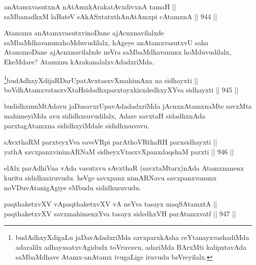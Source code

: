 \begin{shl}
anAtamxvasutxnA nA\s \s tAmx\s kArakatAvxdivxnA tamaH || \\
saMbanadhxM laBateV sAkASxtatxthA\s nAtAmx\s pi cA\s \s tamxnA \hfill || 944 ||  
\end{shl}

\begin{artha}
Atamxnu anAtamxvasutxvinoDane ajAcnxnavilalxde saMbaMdhavanunx\break hoMduvudilalx, hAgeye anAtamxvasutxvU saha AtamxnoDane ajAcnxnavilalxde neVra saMbaMdhavanunx hoMduvudilalx, EkeMdare? Atamxnu kArakanalalxvAdadxriMda.
\end{artha}



\begin{shl}
\footnote{budAdhxyXdigaLu jaDavAdadxriMda savxparxkAsha ceYtanayxvashadiMda adaralilx adhayxsatxvAgidudx toVruvavu, adariMda BArxMti kalipxtavAda saMbaMdhave Atamx-anAtamx ivugaLige iruvudu beVreyilalx.}budAdhxyXdijaRDarUpatAvxtasxvXmahimAnx na sidhayxti || \\
boVdhAtamxvatasxvXtaHsidadhxparxtayxkisxdedhxyXYva sidhayxti \hfill || 945 ||  
\end{shl}

\begin{artha}
budidhxmuMtAdavu jaDasavxrUpavAdadadxriMda jAcnxnAtamxnaMte savxMta mahimeyiMda avu sididhxsuvudilalx, Adare savxtaH sidadhxnAda parxtagAtamxna sididhxyiMdale sididhxsuvavu.
\end{artha}


\begin{shl}
sAvxthaRM parxteyxVva saveVR\s pi parAthoVR\s thaRH parxsidhayxti || \\
yathA savxpanxvinimARNaM sidheyxVtasxvXpanxdaqshaM parxti \hfill || 946 ||  
\end{shl}

\begin{artha}
elAlx parAdhiVna vAda vasutxvu sAvxthaR (savxtaMtarx)nAda Atamxnanenx kuritu sididhxsiruvudu. heVge savxpanx nimARNavu savxpanxvanunx noVDuvAtanigAgiye eMbudu sididhxsuvudu.
\end{artha}


\begin{shl}
paqthaketxvXV vA\s paqthaketxvXV vA neYva tasayx maqSAtamxtA || \\
paqthaketxvXV savxmahimenxYva tasayx sidedhxVH parAtamxvatf \hfill || 947 ||  
\end{shl}

